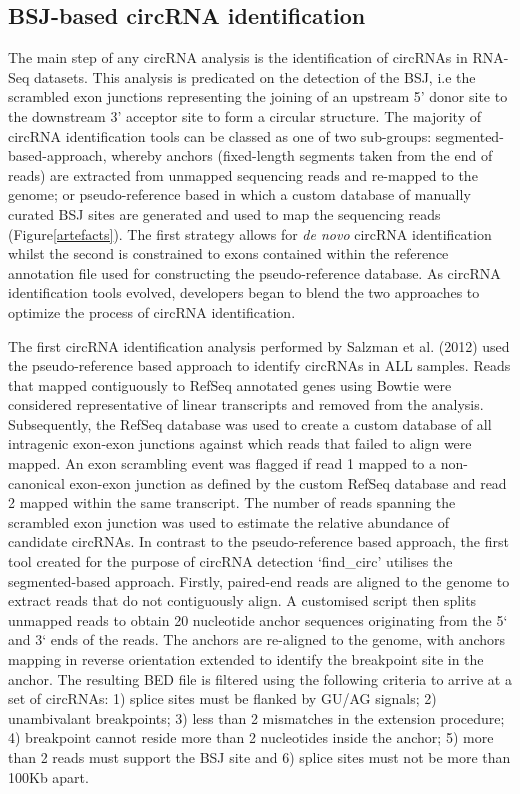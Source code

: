 \documentclass[journal,review,submit,pdftex,moreauthors]{Definitions/mdpi}
\begin{document}
\subsection{BSJ-based circRNA identification}
The main step of any circRNA analysis is the identification of circRNAs in RNA-Seq datasets. This analysis is predicated on the detection of the BSJ, i.e the scrambled exon junctions representing the joining of an upstream 5' donor site to the downstream 3' acceptor site to form a circular structure. The majority of circRNA identification tools can be classed as one of two sub-groups: segmented-based-approach, whereby anchors (fixed-length segments taken from the end of reads) are extracted from unmapped sequencing reads and re-mapped to the genome; or pseudo-reference based in which a custom database of manually curated BSJ sites are generated and used to map the sequencing reads (Figure\ref{artefacts}). The first strategy allows for \textit{de novo} circRNA identification whilst the second is constrained to exons contained within the reference annotation file used for constructing the pseudo-reference database. As circRNA identification tools evolved, developers began to blend the two approaches to optimize the process of circRNA identification. \par
The first circRNA identification analysis performed by Salzman et al. (2012) \cite{Salzman2012} used the pseudo-reference based approach to identify circRNAs in ALL samples. Reads that mapped contiguously to RefSeq annotated genes using Bowtie \cite{Bowtie} were considered representative of linear transcripts and removed from the analysis. Subsequently, the RefSeq database was used to create a custom database of all intragenic exon-exon junctions against which reads that failed to align were mapped. An exon scrambling event was flagged if read 1 mapped to a non-canonical exon-exon junction as defined by the custom RefSeq database and read 2 mapped within the same transcript. The number of reads spanning the scrambled exon junction was used to estimate the relative abundance of candidate circRNAs. In contrast to the pseudo-reference based approach, the first tool created for the purpose of circRNA detection `find\_circ' \cite{find_circ} utilises the segmented-based approach. Firstly, paired-end reads are aligned to the genome to extract reads that do not contiguously align. A customised script then splits unmapped reads to obtain 20 nucleotide anchor sequences originating from the 5` and 3` ends of the reads. The anchors are re-aligned to the genome, with anchors mapping in reverse orientation extended to identify the breakpoint site in the anchor. The resulting BED file is filtered using the following criteria to arrive at a set of circRNAs: 1) splice sites must be flanked by GU/AG signals; 2) unambivalant breakpoints; 3) less than 2 mismatches in the extension procedure; 4) breakpoint cannot reside more than 2 nucleotides inside the anchor; 5) more than 2 reads must support the BSJ site and 6) splice sites must not be more than 100Kb apart. \par
\end{document}
